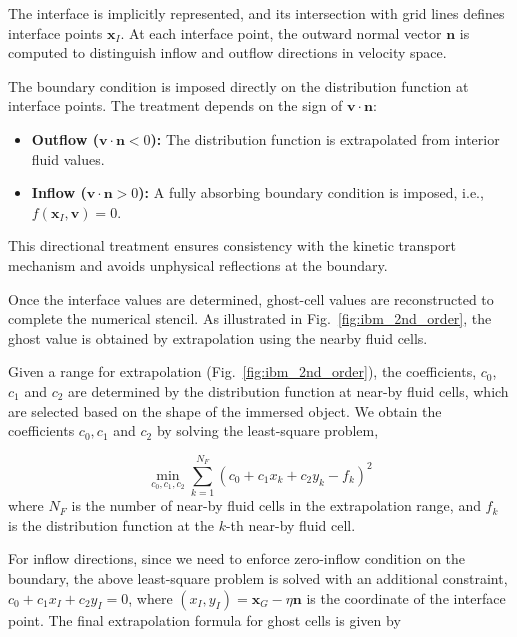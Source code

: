 The interface is implicitly represented, and its intersection with grid lines defines interface points $\mathbf{x}_I$. At each interface point, the outward normal vector $\mathbf{n}$ is computed to distinguish inflow and outflow directions in velocity space.

The boundary condition is imposed directly on the distribution function at interface points. The treatment depends on the sign of $\mathbf{v}\cdot \mathbf{n}$:

\begin{itemize}
	\item \textbf{Outflow ($\mathbf{v}\cdot \mathbf{n} < 0$):}
	      The distribution function is extrapolated from interior fluid values.

	\item \textbf{Inflow ($\mathbf{v}\cdot \mathbf{n} > 0$):}
	      A fully absorbing boundary condition is imposed, i.e., $f(\mathbf{x}_I, \mathbf{v}) = 0$.
\end{itemize}

This directional treatment ensures consistency with the kinetic transport mechanism and avoids unphysical reflections at the boundary.

Once the interface values are determined, ghost-cell values are reconstructed to complete the numerical stencil. As illustrated in Fig.~\ref{fig:ibm_2nd_order}, the ghost value is obtained by extrapolation using the nearby fluid cells.

Given a range for extrapolation (Fig.~\ref{fig:ibm_2nd_order}), the coefficients, $c_0$, $c_1$ and $c_2$ are determined by the distribution function at near-by fluid cells, which are selected based on the shape of the immersed object. We obtain the coefficients $c_0, c_1$ and $c_2$ by solving the least-square problem,

\begin{equation}
	\min_{c_0,c_1,c_2} \sum_{k=1}^{N_F} (c_0 + c_1x_k + c_2y_k - f_k)^2
	\label{eq:least_square_matrix}
\end{equation}
where $N_F$ is the number of near-by fluid cells in the extrapolation range, and $f_k$ is the distribution function at the $k$-th near-by fluid cell.

For inflow directions, since we need to enforce zero-inflow condition on the boundary, the above least-square problem is solved with an additional constraint, $c_0 + c_1x_I + c_2y_I = 0$, where $(x_I, y_I) = \mathbf{x}_G - \eta\mathbf{n}$ is the coordinate of the interface point. The final extrapolation formula for ghost cells is given by

